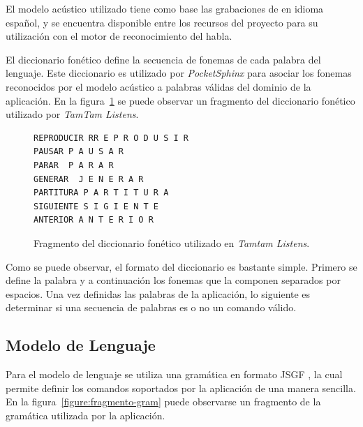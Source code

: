 El modelo ac\'ustico utilizado tiene como base las grabaciones de  en idioma espa\~nol,
y se encuentra disponible entre los recursos del proyecto  para su utilizaci\'on
con el motor de reconocimiento del habla.

El diccionario fon\'etico define la secuencia de fonemas de cada palabra del lenguaje.
Este diccionario es utilizado por \emph{PocketSphinx} para asociar los fonemas reconocidos por
el modelo ac\'ustico a palabras v\'alidas del dominio de la aplicaci\'on.
En la figura~\ref{figure:fragmento-dic} se puede observar un fragmento del diccionario fon\'etico
utilizado por \emph{TamTam Listens}.

\lstset{
  basicstyle=\scriptsize,        %
  breakatwhitespace=false,         %
  frame=single,                    %
  language=Octave,                 %
  numbersep=5pt,                   %
  showstringspaces=false,          %
  stepnumber=2,                    %
  tabsize=2                       %
}

\begin{figure}[H]
\begin{lstlisting}
REPRODUCIR RR E P R O D U S I R
PAUSAR P A U S A R
PARAR  P A R A R
GENERAR  J E N E R A R
PARTITURA P A R T I T U R A
SIGUIENTE S I G I E N T E
ANTERIOR A N T E R I O R
\end{lstlisting}
\caption{Fragmento del diccionario fon\'etico utilizado en \emph{Tamtam Listens}.}
\label{figure:fragmento-dic}
\end{figure}

Como se puede observar, el formato del diccionario es bastante simple. Primero se define la palabra y 
a continuaci\'on los fonemas que la componen separados por espacios.
Una vez definidas las palabras de la aplicaci\'on, lo siguiente es determinar si una secuencia de
palabras es o no un comando v\'alido.

\subsection{Modelo de Lenguaje}
\label{sec:lenguaje-solucion}

Para el modelo de lenguaje se utiliza una gram\'atica en formato JSGF \cite{JSGF2000}, la cual permite
definir los comandos soportados por la aplicaci\'on de una manera sencilla.
En la figura~\ref{figure:fragmento-gram} puede observarse un fragmento de la gram\'atica utilizada por 
la aplicaci\'on.

